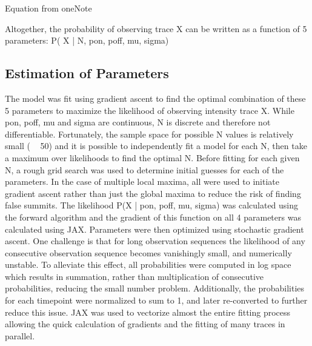 Equation from oneNote



Altogether, the probability of observing trace X can be written as a function of 5 parameters:
P( X | N, pon, poff, mu, sigma)

\subsection{Estimation of Parameters}

The model was fit using gradient ascent to find the optimal combination of these 5 parameters to maximize the likelihood of observing intensity trace X. While pon, poff, mu and sigma are continuous, N is discrete and therefore not differentiable. Fortunately, the sample space for possible N values is relatively small ( ~ 50) and it is possible to independently fit a model for each N, then take a maximum over likelihoods to find the optimal N. 
Before fitting for each given N, a rough grid search was used to determine initial guesses for each of the parameters. In the case of multiple local maxima, all were used to initiate gradient ascent rather than just the global maxima to reduce the risk of finding false summits. The likelihood P(X | pon, poff, mu, sigma) was calculated using the forward algorithm and the gradient of this function on all 4 parameters was calculated using JAX. Parameters were then optimized using stochastic gradient ascent.
One challenge is that for long observation sequences the likelihood of any consecutive observation sequence becomes vanishingly small, and numerically unstable. To alleviate this effect, all probabilities were computed in log space which results in summation, rather than multiplication of consecutive probabilities, reducing the small number problem. Additionally, the probabilities for each timepoint were normalized to sum to 1, and later re-converted to further reduce this issue. JAX was used to vectorize almost the entire fitting process allowing the quick calculation of gradients and the fitting of many traces in parallel. 

